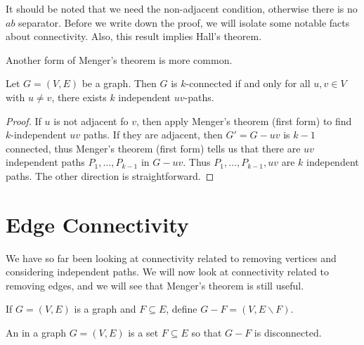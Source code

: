 \documentclass[a4paper]{scrreprt}
\begin{document}
\begin{remark}
	It should be noted that we need the non-adjacent condition, otherwise there is no $ab$ separator. Before we write down the proof, we will isolate some notable facts about connectivity.
	Also, this result implies Hall's theorem.
\end{remark}

Another form of Menger's theorem is more common.

\begin{theorem}
	Let $G = (V, E)$ be a graph. Then $G$ is $k$-connected if and only for all $u, v \in V$ with $u \neq v$, there exists $k$ independent $uv$-paths.
\end{theorem}
\begin{proof}
	If $u$ is not adjacent fo $v$, then apply Menger's theorem (first form) to find $k$-independent $uv$ paths. If they are adjacent, then $G' = G - uv$ is $k - 1$ connected, thus Menger's theorem (first form) tells us that there are $uv$ independent paths $P_1, \dots, P_{k - 1}$ in $G - uv$. Thus $P_1, \dots, P_{k - 1}, uv$ are $k$ independent paths. The other direction is straightforward. 
\end{proof}

\section{Edge Connectivity}

We have so far been looking at connectivity related to removing vertices and considering independent paths. We will now look at connectivity related to removing edges, and we will see that Menger's theorem is still useful.

\begin{notation}
	If $G = (V, E)$ is a graph and $F \subseteq E$, define $G - F = (V, E \backslash F)$.
\end{notation}

\begin{definition}
	An  in a graph $G = (V, E)$ is a set $F \subseteq E$ so that $G - F$ is disconnected.
\end{definition}
\end{document}
